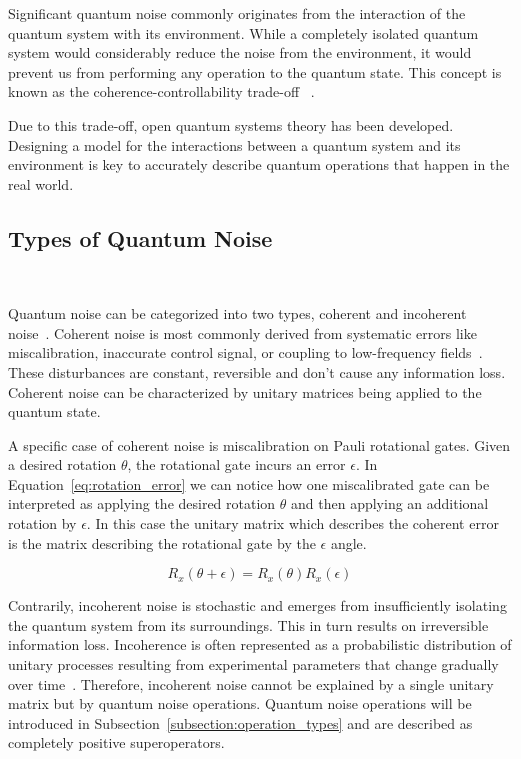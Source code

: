 Significant quantum noise commonly originates from the interaction of
the quantum system with its environment. While a completely isolated
quantum system would considerably reduce the noise from the environment,
it would prevent us from performing any operation to the quantum state.
This concept is known as the coherence-controllability trade-off
~\cite{yoneda_quantum-dot_2018}. \

Due to this trade-off, open quantum systems theory has been developed.
Designing a model for the interactions between a quantum system and
its environment is key to accurately describe quantum operations that
happen in the real world. \

\subsection{Types of Quantum Noise}\label{subsection:noise_types} \

Quantum noise can be categorized into two types, coherent and
incoherent noise~\cite{pravia_robust_2003}. Coherent noise is most commonly
derived from systematic errors like miscalibration, inaccurate
control signal, or coupling to low-frequency fields~\cite{kaufmann_characterization_2023}.
These disturbances are constant, reversible and don't cause any
information loss. Coherent noise can be characterized by unitary matrices
being applied to the quantum state. \

A specific case of coherent noise is miscalibration on Pauli rotational
gates. Given a desired rotation \(\theta\), the rotational gate incurs
an error \(\epsilon\). In Equation~\ref{eq:rotation_error} we can notice
how one miscalibrated gate can be interpreted as applying the desired
rotation \(\theta\) and then applying an additional rotation by
\(\epsilon\). In this case the unitary matrix which describes the
coherent error is the matrix describing the rotational gate by the
\(\epsilon\) angle. \

\begin{equation}\label{eq:rotation_error}
  R_x\left(\theta + \epsilon\right) = R_x\left(\theta\right)R_x\left(\epsilon\right)
\end{equation}

Contrarily, incoherent noise is stochastic and emerges from insufficiently
isolating the quantum system from its surroundings. This in turn results
on irreversible information loss. Incoherence is often represented as a
probabilistic distribution of unitary processes resulting from experimental
parameters that change gradually over time~\cite{boulant_incoherent_2004}.
Therefore, incoherent noise cannot be explained by a single unitary matrix
but by quantum noise operations. Quantum noise operations will be introduced
in Subsection~\ref{subsection:operation_types} and are described as
completely positive superoperators. \

